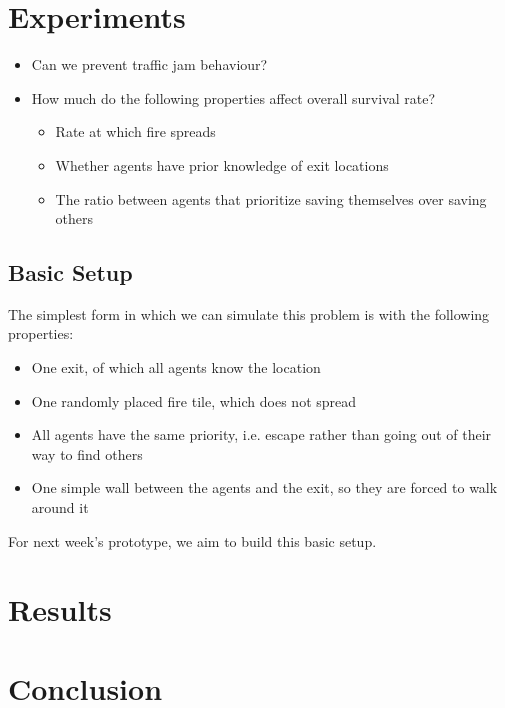 \documentclass[a4paper]{article}
\begin{document}
\section{Experiments}
\begin{itemize}
\item Can we prevent traffic jam behaviour?
\item How much do the following properties affect overall survival rate?
\begin{itemize}
\item Rate at which fire spreads
\item Whether agents have prior knowledge of exit locations
\item The ratio between agents that prioritize saving themselves over saving others
\end{itemize}
\end{itemize}

\subsection{Basic Setup}
The simplest form in which we can simulate this problem is with the following properties:
\begin{itemize}
\item One exit, of which all agents know the location
\item One randomly placed fire tile, which does not spread
\item All agents have the same priority, i.e. escape rather than going out of their way to find others
\item One simple wall between the agents and the exit, so they are forced to walk around it
\end{itemize}
For next week's prototype, we aim to build this basic setup.

\section{Results}

\section{Conclusion}
\end{document}
